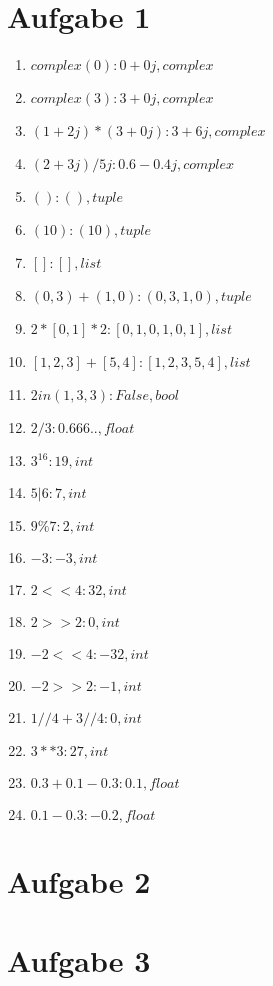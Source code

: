 
\newcommand{\dozent}{Prof. Dr. Claudia Müller-Birn, Barry Linnert}					%
\newcommand{\tutor}{Thierry Meurers}						%
\newcommand{\tutoriumNo}{10}				%
\newcommand{\ubungNo}{02}									%
\newcommand{\veranstaltung}{Objektorientierte Programmierung}	%
\newcommand{\semester}{SoSe 17}						%
\newcommand{\studenten}{Stefaan Hessmann, Jaap Pedersen, Mark Niehues}			%




\section{Aufgabe 1}

\begin{enumerate}
\item $complex(0): 0+0j, complex$
\item $complex(3): 3+0j, complex$
\item $(1+2j)*(3+0j): 3+6j, complex$
\item $(2+3j)/5j: 0.6-0.4j, complex$
\item $(): (), tuple$
\item $(10): (10), tuple$
\item $[]: [], list$
\item $(0,3)+(1,0): (0,3,1,0), tuple$
\item $2*[0,1]*2: [0,1,0,1,0,1], list$
\item $[1,2,3]+[5,4]: [1,2,3,5,4], list$
\item $2 in (1,3,3): False, bool$
\item $2/3: 0.666.., float$
\item $3^16: 19, int$
\item $5|6: 7, int$
\item $9\%7: 2, int$
\item $-3: -3, int$
\item $2<<4: 32, int$
\item $2>>2: 0, int$
\item $-2<<4: -32, int$
\item $-2>>2: -1, int$
\item $1//4+3//4: 0, int$
\item $3**3: 27, int$
\item $0.3+0.1-0.3: 0.1, float$
\item $0.1-0.3: -0.2, float$
\end{enumerate}
\section{Aufgabe 2}

\section{Aufgabe 3}


